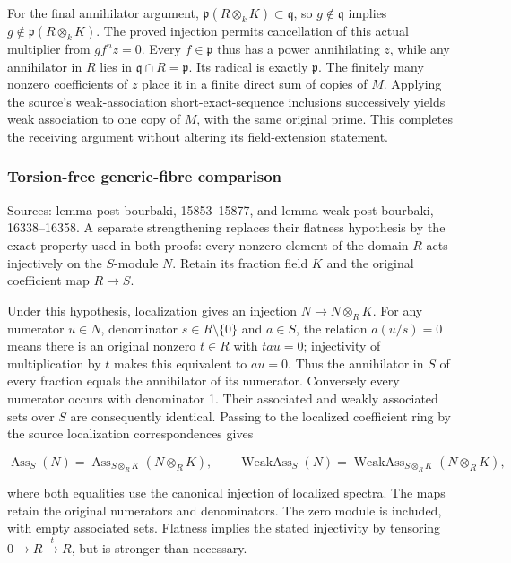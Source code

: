 For the final annihilator argument, \(\mathfrak p(R\otimes_kK)\subset\mathfrak q\), so \(g\notin\mathfrak q\) implies \(g\notin\mathfrak p(R\otimes_kK)\). The proved injection permits cancellation of this actual multiplier from \(gf^nz=0\). Every \(f\in\mathfrak p\) thus has a power annihilating \(z\), while any annihilator in \(R\) lies in \(\mathfrak q\cap R=\mathfrak p\). Its radical is exactly \(\mathfrak p\). The finitely many nonzero coefficients of \(z\) place it in a finite direct sum of copies of \(M\). Applying the source's weak-association short-exact-sequence inclusions successively yields weak association to one copy of \(M\), with the same original prime. This completes the receiving argument without altering its field-extension statement.

\subsubsection{Torsion-free generic-fibre comparison}\label{torsion-free-generic-fibre-comparison}

Sources: lemma-post-bourbaki, 15853--15877, and lemma-weak-post-bourbaki, 16338--16358. A separate strengthening replaces their flatness hypothesis by the exact property used in both proofs: every nonzero element of the domain \(R\) acts injectively on the \(S\)-module \(N\). Retain its fraction field \(K\) and the original coefficient map \(R\to S\).

Under this hypothesis, localization gives an injection \(N\to N\otimes_RK\). For any numerator \(u\in N\), denominator \(s\in R\setminus\{0\}\) and \(a\in S\), the relation \(a(u/s)=0\) means there is an original nonzero \(t\in R\) with \(tau=0\); injectivity of multiplication by \(t\) makes this equivalent to \(au=0\). Thus the annihilator in \(S\) of every fraction equals the annihilator of its numerator. Conversely every numerator occurs with denominator 1. Their associated and weakly associated sets over \(S\) are consequently identical. Passing to the localized coefficient ring by the source localization correspondences gives

\[
\operatorname{Ass}_S(N)=\operatorname{Ass}_{S\otimes_RK}(N\otimes_RK),\qquad
\operatorname{WeakAss}_S(N)=\operatorname{WeakAss}_{S\otimes_RK}(N\otimes_RK),
\]

where both equalities use the canonical injection of localized spectra. The maps retain the original numerators and denominators. The zero module is included, with empty associated sets. Flatness implies the stated injectivity by tensoring \(0\to R\xrightarrow{t}R\), but is stronger than necessary.


